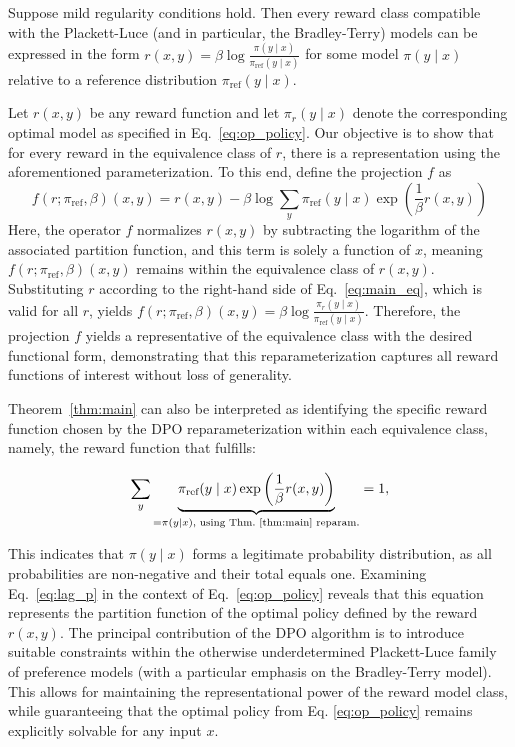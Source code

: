 \begin{theorem}\label{thm:main}
Suppose mild regularity conditions hold. Then every reward class compatible with the Plackett-Luce (and in particular, the Bradley-Terry) models can be expressed in the form ${r(x, y) = \beta \log \frac{\pi(y\mid x)}{\pi_\text{ref}(y\mid x)}}$ for some model $\pi(y\mid x)$ relative to a reference distribution $\pi_\text{ref}(y\mid x)$.
\end{theorem}

\begin{sproof}
Let $r(x, y)$ be any reward function and let $\pi_r(y \mid x)$ denote the corresponding optimal model as specified in Eq.~\ref{eq:op_policy}. Our objective is to show that for every reward in the equivalence class of $r$, there is a representation using the aforementioned parameterization. To this end, define the projection $f$ as
\begin{equation}
    f(r; \pi_\text{ref}, \beta)(x, y) = r(x, y) - \beta\log\sum_{y}\pi_\text{ref}(y\mid x)\exp\left(\frac{1}{\beta}r(x, y)\right)
\end{equation}
Here, the operator $f$ normalizes $r(x, y)$ by subtracting the logarithm of the associated partition function, and this term is solely a function of $x$, meaning $f(r; \pi_\text{ref}, \beta)(x, y)$ remains within the equivalence class of $r(x, y)$. Substituting $r$ according to the right-hand side of Eq.~\ref{eq:main_eq}, which is valid for all $r$, yields $f(r; \pi_\text{ref}, \beta)(x, y) = \beta \log \frac{\pi_r(y\mid x)}{\pi_\text{ref}(y\mid x)}$. Therefore, the projection $f$ yields a representative of the equivalence class with the desired functional form, demonstrating that this reparameterization captures all reward functions of interest without loss of generality.
\end{sproof}

Theorem~\ref{thm:main} can also be interpreted as identifying the specific reward function chosen by the DPO reparameterization within each equivalence class, namely, the reward function that fulfills:

\begin{equation}\label{eq:lag_p}
     \sum_{y}\underbrace{\pi_\text{ref}(y\mid x)\exp\left(\frac{1}{\beta}r(x, y)\right)}_{=\pi(y\mid x)\text{, using Thm.~\ref{thm:main} reparam.}} = 1,
\end{equation}

This indicates that $\pi(y\mid x)$ forms a legitimate probability distribution, as all probabilities are non-negative and their total equals one. Examining Eq.~\ref{eq:lag_p} in the context of Eq.~\ref{eq:op_policy} reveals that this equation represents the partition function of the optimal policy defined by the reward $r(x, y)$. The principal contribution of the DPO algorithm is to introduce suitable constraints within the otherwise underdetermined Plackett-Luce family of preference models (with a particular emphasis on the Bradley-Terry model). This allows for maintaining the representational power of the reward model class, while guaranteeing that the optimal policy from Eq. \ref{eq:op_policy} remains explicitly solvable for any input $x$.

